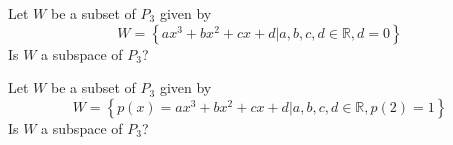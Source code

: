 \begin{enumialphparenastyle}
\begin{ex} Let $W$ be a subset of $P_3$ given by 
\[
W = \left\{ 
ax^3 + bx^2 + cx + d | a,b,c,d \in \mathbb{R}, d = 0 \right\}
\]
Is $W$ a subspace of $P_3$?
\end{ex}

\begin{ex} Let $W$ be a subset of $P_3$ given by 
\[
W = \left\{ 
p(x) = ax^3 + bx^2 + cx + d | a,b,c,d \in \mathbb{R}, p(2) = 1 \right\}
\]
Is $W$ a subspace of $P_3$?
\end{ex}

\end{enumialphparenastyle}